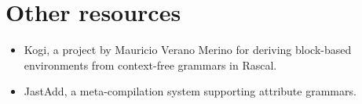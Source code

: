 \documentclass[a4paper, 11pt]{article}
\begin{document}
\section*{Other resources}
\begin{itemize}
	\item Kogi, a project by Mauricio Verano Merino for deriving block-based environments from context-free grammars in Rascal.
	\item JastAdd, a meta-compilation system supporting attribute grammars.

\end{itemize}
\end{document}
